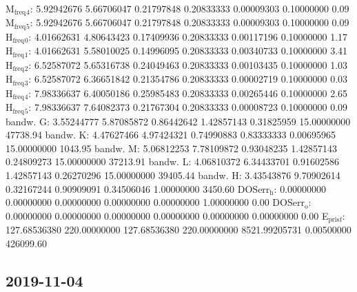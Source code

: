 \documentclass[11pt]{article}
\begin{document}
M\(_{\text{freq}}\)\(_{\text{4}}\):   5.92942676   5.66706047   0.21797848   0.20833333   0.00009303   0.10000000         0.09
M\(_{\text{freq}}\)\(_{\text{5}}\):   5.92942676   5.66706047   0.21797848   0.20833333   0.00009303   0.10000000         0.09
H\(_{\text{freq}}\)\(_{\text{0}}\):   4.01662631   4.80643423   0.17409936   0.20833333   0.00117196   0.10000000         1.17
H\(_{\text{freq}}\)\(_{\text{1}}\):   4.01662631   5.58010025   0.14996095   0.20833333   0.00340733   0.10000000         3.41
H\(_{\text{freq}}\)\(_{\text{2}}\):   6.52587072   5.65316738   0.24049463   0.20833333   0.00103435   0.10000000         1.03
H\(_{\text{freq}}\)\(_{\text{3}}\):   6.52587072   6.36651842   0.21354786   0.20833333   0.00002719   0.10000000         0.03
H\(_{\text{freq}}\)\(_{\text{4}}\):   7.98336637   6.40050186   0.25985483   0.20833333   0.00265446   0.10000000         2.65
H\(_{\text{freq}}\)\(_{\text{5}}\):   7.98336637   7.64082373   0.21767304   0.20833333   0.00008723   0.10000000         0.09
bandw. G:   3.55244777   5.87085872   0.86442642   1.42857143   0.31825959  15.00000000     47738.94
bandw. K:   4.47627466   4.97424321   0.74990883   0.83333333   0.00695965  15.00000000      1043.95
bandw. M:   5.06812253   7.78109872   0.93048235   1.42857143   0.24809273  15.00000000     37213.91
bandw. L:   4.06810372   6.34433701   0.91602586   1.42857143   0.26270296  15.00000000     39405.44
bandw. H:   3.43543876   9.70902614   0.32167244   0.90909091   0.34506046   1.00000000      3450.60
DOSerr\(_{\text{h}}\):   0.00000000   0.00000000   0.00000000   0.00000000   0.00000000   1.00000000         0.00
DOSerr\(_{\text{o}}\):   0.00000000   0.00000000   0.00000000   0.00000000   0.00000000   0.00000000         0.00
E\(_{\text{pris}}\)\(_{\text{f}}\): 127.68536380 220.00000000 127.68536380 220.00000000 8521.99205731   0.00500000    426099.60

\subsection{2019-11-04}
\label{sec:orga8962df}
\end{document}
